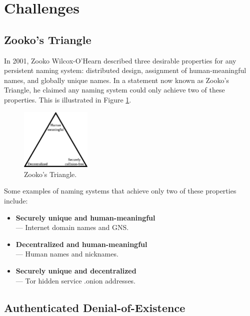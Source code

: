 \documentclass{sig-alternate}
\begin{document}
\section{Challenges}

\subsection{Zooko's Triangle}

In 2001, Zooko Wilcox-O'Hearn described three desirable properties for any persistent naming system: distributed design, assignment of human-meaningful names, and globally unique names. In a statement now known as Zooko's Triangle,\cite{ferdous2009security}\cite{stiegler2005petname} he claimed any naming system could only achieve two of these properties. This is illustrated in Figure \ref{fig:ZookosTriangle}.

\begin{figure}[htbp]
	\centering
	\includegraphics[width=0.3\textwidth]{../images/Zooko.eps}
	\caption{Zooko's Triangle.}
	\label{fig:ZookosTriangle}
\end{figure}

Some examples of naming systems that achieve only two of these properties include:

\begin{itemize}[noitemsep]
	\item \textbf{Securely unique and human-meaningful} \\ --- Internet domain names and GNS.
	\item \textbf{Decentralized and human-meaningful} \\ --- Human names and nicknames.
	\item \textbf{Securely unique and decentralized} \\ --- Tor hidden service .onion addresses.
\end{itemize}


\subsection{Authenticated Denial-of-Existence}
\end{document}
